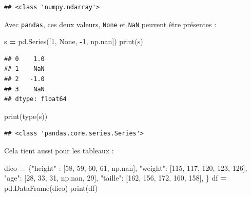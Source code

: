 \documentclass[12pt,]{book}
\newenvironment{Shaded}{\begin{snugshade}}{\end{snugshade}}
\newcommand{\DecValTok}[1]{\textcolor[rgb]{0.00,0.00,0.81}{#1}}
\newcommand{\StringTok}[1]{\textcolor[rgb]{0.31,0.60,0.02}{#1}}
\newcommand{\VariableTok}[1]{\textcolor[rgb]{0.00,0.00,0.00}{#1}}
\newcommand{\OperatorTok}[1]{\textcolor[rgb]{0.81,0.36,0.00}{\textbf{#1}}}
\newcommand{\BuiltInTok}[1]{#1}
\newcommand{\NormalTok}[1]{#1}
\numberwithin{equation}{section}
\numberwithin{countremarque}{section}
\begin{document}
\begin{lstlisting}
## <class 'numpy.ndarray'>
\end{lstlisting}

Avec \texttt{pandas}, ces deux valeurs, \texttt{None} et \texttt{NaN}
peuvent être présentes :

\begin{Shaded}
\begin{Highlighting}[]
\NormalTok{s }\OperatorTok{=}\NormalTok{ pd.Series([}\DecValTok{1}\NormalTok{, }\VariableTok{None}\NormalTok{, }\OperatorTok{-}\DecValTok{1}\NormalTok{, np.nan])}
\BuiltInTok{print}\NormalTok{(s)}
\end{Highlighting}
\end{Shaded}

\begin{lstlisting}
## 0    1.0
## 1    NaN
## 2   -1.0
## 3    NaN
## dtype: float64
\end{lstlisting}

\begin{Shaded}
\begin{Highlighting}[]
\BuiltInTok{print}\NormalTok{(}\BuiltInTok{type}\NormalTok{(s))}
\end{Highlighting}
\end{Shaded}

\begin{lstlisting}
## <class 'pandas.core.series.Series'>
\end{lstlisting}

Cela tient aussi pour les tableaux :

\begin{Shaded}
\begin{Highlighting}[]
\NormalTok{dico }\OperatorTok{=}\NormalTok{ \{}\StringTok{"height"}\NormalTok{ : [}\DecValTok{58}\NormalTok{, }\DecValTok{59}\NormalTok{, }\DecValTok{60}\NormalTok{, }\DecValTok{61}\NormalTok{, np.nan],}
        \StringTok{"weight"}\NormalTok{: [}\DecValTok{115}\NormalTok{, }\DecValTok{117}\NormalTok{, }\DecValTok{120}\NormalTok{, }\DecValTok{123}\NormalTok{, }\DecValTok{126}\NormalTok{],}
        \StringTok{"age"}\NormalTok{: [}\DecValTok{28}\NormalTok{, }\DecValTok{33}\NormalTok{, }\DecValTok{31}\NormalTok{, np.nan, }\DecValTok{29}\NormalTok{],}
        \StringTok{"taille"}\NormalTok{: [}\DecValTok{162}\NormalTok{, }\DecValTok{156}\NormalTok{, }\DecValTok{172}\NormalTok{, }\DecValTok{160}\NormalTok{, }\DecValTok{158}\NormalTok{],}
\NormalTok{       \} }
\NormalTok{df }\OperatorTok{=}\NormalTok{ pd.DataFrame(dico)}
\BuiltInTok{print}\NormalTok{(df)}
\end{Highlighting}
\end{Shaded}
\end{document}
